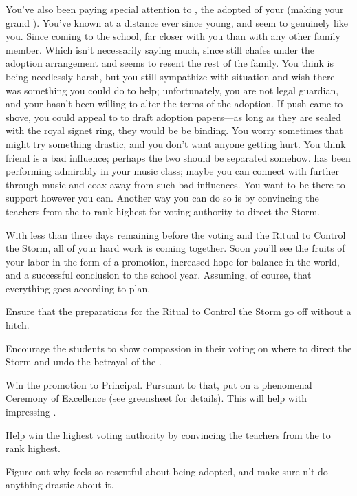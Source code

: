 \documentclass[char]{GL2020}
\begin{document}
You've also been paying special attention to \cAdopted{\full}, the adopted \cAdopted{\child} of your \cAdoptedParentOne{\nibling} (making \cAdopted{} your grand \cAdopted{\nibling}). You've known \cAdopted{} at a distance ever since \cAdopted{\they} \cAdopted{\were} young, and \cAdopted{\they} seem\cAdopted{\plural} to genuinely like you. Since coming to the school, \cAdopted{\theyare} far closer with you than with any other family member. Which isn't necessarily saying much, since \cAdopted{} still chafes under the adoption arrangement and seems to resent the rest of the family. You think \cAdopted{} is being needlessly harsh, but you still sympathize with \cAdopted{\their} situation and wish there was something you could do to help; unfortunately, you are not \cAdopted{\their} legal guardian, and your \cAdoptedParentOne{\nibling} hasn't been willing to alter the terms of the adoption. If push came to shove, you could appeal to \cPrince{\full} to draft adoption papers---as long as they are sealed with the royal signet ring, they would be be binding. You worry sometimes that \cAdopted{} might try something drastic, and you don't want anyone getting hurt. You think \cAdopted{\their} friend \cLibAssist{\full} is a bad influence; perhaps the two should be separated somehow. \cAdopted{} has been performing admirably in your music class; maybe you can connect with \cAdopted{\them} further through music and coax \cAdopted{\them} away from such bad influences. You want to be there to support \cAdopted{} however you can. Another way you can do so is by convincing the teachers from the \pTech{} to rank \cAdopted{\them} highest for voting authority to direct the Storm.

With less than three days remaining before the voting and the Ritual to Control the Storm, all of your hard work is coming together. Soon you'll see the fruits of your labor in the form of a promotion, increased hope for balance in the world, and a successful conclusion to the school year. Assuming, of course, that everything goes according to plan.

\begin{itemz}
	\item Ensure that the preparations for the Ritual to Control the Storm go off without a hitch.
	\item Encourage the students to show compassion in their voting on where to direct the Storm and undo the betrayal of the \pShip{}.
	\item Win the promotion to Principal. Pursuant to that, put on a phenomenal Ceremony of Excellence (see greensheet for details). This will help with impressing \cPrincipal{}.
	\item Help \cAdopted{} win the highest voting authority by convincing the teachers from the \pTech{} to rank \cAdopted{\them} highest.
	\item Figure out why \cAdopted{} feels so resentful about being adopted, and make sure \cAdopted{\they} \cAdopted{\does}n't do anything drastic about it.
\end{itemz}
\end{document}
